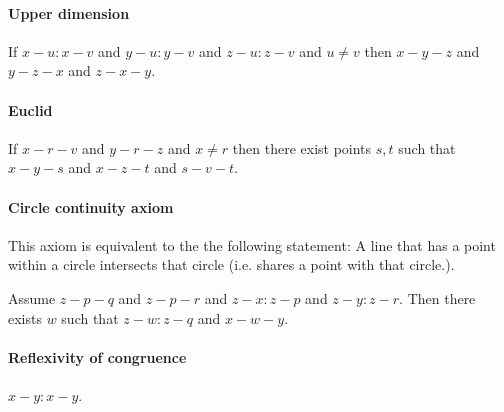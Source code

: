 \documentclass{article}
\begin{document}
  \paragraph{Upper dimension}

  \begin{forthel}
    \begin{axiom}[A9]
      If $x-u : x-v$ and $y-u : y-v$ and $z-u : z-v$ and $u \neq v$ then $x-y-z$ and $y-z-x$ and $z-x-y$.
    \end{axiom}
  \end{forthel}


  \paragraph{Euclid}

  \begin{forthel}
    \begin{axiom}[A10]
      If $x-r-v$ and $y-r-z$ and $x \neq r$ then there exist points $s,t$ such that $x-y-s$ and $x-z-t$ and $s-v-t$.
    \end{axiom}
  \end{forthel}


  \paragraph{Circle continuity axiom} This axiom is equivalent to the the following statement: A line that has a point within a circle intersects that circle (i.e. shares a point with that circle.).

  \begin{forthel}
    \begin{axiom}[CA]
      Assume $z-p-q$ and $z-p-r$ and $z-x : z-p$ and $z-y : z-r$. Then there exists $w$ such that $z-w : z-q$ and $x-w-y$.
    \end{axiom}
  \end{forthel}







  \paragraph{Reflexivity of congruence}

  \begin{forthel}
    \begin{lemma}[L2o1]
      $x-y : x-y$.
    \end{lemma}
  \end{forthel}
\end{document}
